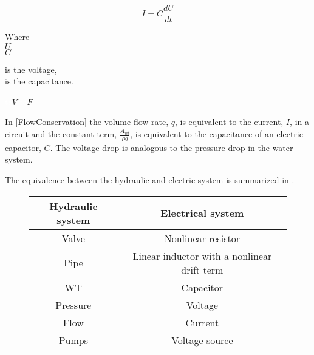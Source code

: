 \begin{equation}
  I = C \frac{dU}{dt}
  \label{ElecCircuirt}
\end{equation}

\begin{minipage}[t]{0.20\textwidth}
Where\\
\hspace*{8mm} $U$ \\
\hspace*{8mm} $C$ 
\end{minipage}
\begin{minipage}[t]{0.68\textwidth}
\vspace*{2mm}
is the voltage,\\
is the capacitance.
\end{minipage}
\begin{minipage}[t]{0.10\textwidth}
\vspace*{2mm}
\textcolor{White}{te}$\unit{V}$
\textcolor{White}{te}$\unit{F}$
\end{minipage}

In \eqref{FlowConservation} the volume flow rate, $q$, is equivalent to the current, $I$, in a circuit and the constant term, $\frac{A_{wt}}{\rho g}$, is equivalent to the capacitance of an electric capacitor, $C$. The voltage drop is analogous to the pressure drop in the water system.


%
%
The equivalence between the hydraulic and electric system is summarized in .

\begin{figure}[H]
	\centering
\begin{tabular}{c|c} 
  			\bfseries Hydraulic system    &     \bfseries Electrical system  \\ \hline
			Valve		  	  &     Nonlinear resistor   \\ 
			Pipe              &     Linear inductor with a nonlinear drift term       \\ 
			WT 		          &     Capacitor       \\
			Pressure	 	  &     Voltage    \\
			Flow 		      &     Current       \\  
			Pumps 		      &     Voltage source           
\end{tabular}
		\label{tab:hydraulic_electrical}

\end{figure}	


	